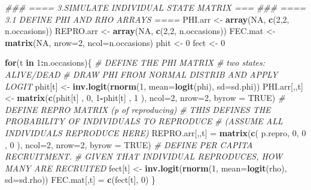 \documentclass[
]{article}
\newenvironment{Shaded}{\begin{snugshade}}{\end{snugshade}}
\newcommand{\CommentTok}[1]{\textcolor[rgb]{0.56,0.35,0.01}{\textit{#1}}}
\newcommand{\ControlFlowTok}[1]{\textcolor[rgb]{0.13,0.29,0.53}{\textbf{#1}}}
\newcommand{\DataTypeTok}[1]{\textcolor[rgb]{0.13,0.29,0.53}{#1}}
\newcommand{\DecValTok}[1]{\textcolor[rgb]{0.00,0.00,0.81}{#1}}
\newcommand{\KeywordTok}[1]{\textcolor[rgb]{0.13,0.29,0.53}{\textbf{#1}}}
\newcommand{\NormalTok}[1]{#1}
\newcommand{\OperatorTok}[1]{\textcolor[rgb]{0.81,0.36,0.00}{\textbf{#1}}}
\newcommand{\OtherTok}[1]{\textcolor[rgb]{0.56,0.35,0.01}{#1}}
\newcommand{\StringTok}[1]{\textcolor[rgb]{0.31,0.60,0.02}{#1}}
\begin{document}
\begin{Shaded}
\begin{Highlighting}[]
\CommentTok{### ==== 3.SIMULATE INDIVIDUAL STATE MATRIX ===}
\CommentTok{### ====  3.1 DEFINE PHI AND RHO ARRAYS ====  }
\NormalTok{PHI.arr <-}\StringTok{ }\KeywordTok{array}\NormalTok{(}\OtherTok{NA}\NormalTok{, }\KeywordTok{c}\NormalTok{(}\DecValTok{2}\NormalTok{,}\DecValTok{2}\NormalTok{, n.occasions))}
\NormalTok{REPRO.arr <-}\StringTok{ }\KeywordTok{array}\NormalTok{(}\OtherTok{NA}\NormalTok{, }\KeywordTok{c}\NormalTok{(}\DecValTok{2}\NormalTok{,}\DecValTok{2}\NormalTok{, n.occasions))}
\NormalTok{FEC.mat <-}\StringTok{ }\KeywordTok{matrix}\NormalTok{(}\OtherTok{NA}\NormalTok{, }\DataTypeTok{nrow=}\DecValTok{2}\NormalTok{, }\DataTypeTok{ncol=}\NormalTok{n.occasions)}
\NormalTok{phit <-}\StringTok{ }\DecValTok{0}
\NormalTok{fect <-}\StringTok{ }\DecValTok{0}

\ControlFlowTok{for}\NormalTok{(t }\ControlFlowTok{in} \DecValTok{1}\OperatorTok{:}\NormalTok{n.occasions)\{}
   \CommentTok{# DEFINE THE PHI MATRIX}
   \CommentTok{# two states: ALIVE/DEAD}
   \CommentTok{# DRAW PHI FROM NORMAL DISTRIB AND APPLY LOGIT }
\NormalTok{   phit[t]  <-}\StringTok{   }\KeywordTok{inv.logit}\NormalTok{(}\KeywordTok{rnorm}\NormalTok{(}\DecValTok{1}\NormalTok{, }\DataTypeTok{mean=}\KeywordTok{logit}\NormalTok{(phi), }\DataTypeTok{sd=}\NormalTok{sd.phi))}
\NormalTok{   PHI.arr[,,t] <-}\StringTok{  }\KeywordTok{matrix}\NormalTok{(}\KeywordTok{c}\NormalTok{(phit[t]       , }\DecValTok{0}\NormalTok{, }
                             \DecValTok{1}\OperatorTok{-}\NormalTok{phit[t] , }\DecValTok{1}\NormalTok{ ), }\DataTypeTok{ncol=}\DecValTok{2}\NormalTok{, }\DataTypeTok{nrow=}\DecValTok{2}\NormalTok{, }\DataTypeTok{byrow =} \OtherTok{TRUE}\NormalTok{)}
   \CommentTok{# DEFINE REPRO MATRIX (p of reproducing)}
   \CommentTok{# THIS DEFINES THE PROBABILITY OF INDIVIDUALS TO REPRODUCE }
   \CommentTok{# (ASSUME ALL INDIVIDUALS REPRODUCE HERE)}
\NormalTok{   REPRO.arr[,,t] =}\StringTok{ }\KeywordTok{matrix}\NormalTok{(}\KeywordTok{c}\NormalTok{( p.repro, }\DecValTok{0}\NormalTok{,}
                              \DecValTok{0}\NormalTok{      , }\DecValTok{0}\NormalTok{ ), }\DataTypeTok{ncol=}\DecValTok{2}\NormalTok{, }\DataTypeTok{nrow=}\DecValTok{2}\NormalTok{, }\DataTypeTok{byrow =} \OtherTok{TRUE}\NormalTok{)}
   \CommentTok{# DEFINE PER CAPITA RECRUITMENT.}
   \CommentTok{# GIVEN THAT INDIVIDUAL REPRODUCES, HOW MANY ARE RECRUITED}
\NormalTok{   fect[t] <-}\StringTok{   }\KeywordTok{inv.logit}\NormalTok{(}\KeywordTok{rnorm}\NormalTok{(}\DecValTok{1}\NormalTok{, }\DataTypeTok{mean=}\KeywordTok{logit}\NormalTok{(rho), }\DataTypeTok{sd=}\NormalTok{sd.rho))}
\NormalTok{   FEC.mat[,t] =}\StringTok{ }\KeywordTok{c}\NormalTok{(fect[t], }\DecValTok{0}\NormalTok{)}
\NormalTok{\}}


\end{Highlighting}
\end{Shaded}
\end{document}
